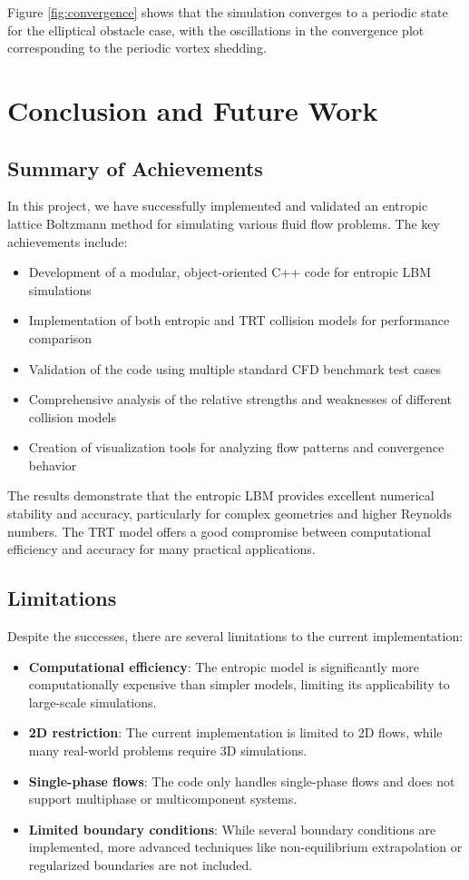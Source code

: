 \documentclass[12pt,a4paper]{article}
\begin{document}
Figure \ref{fig:convergence} shows that the simulation converges to a periodic state for the elliptical obstacle case, with the oscillations in the convergence plot corresponding to the periodic vortex shedding.

\section{Conclusion and Future Work}

\subsection{Summary of Achievements}
In this project, we have successfully implemented and validated an entropic lattice Boltzmann method for simulating various fluid flow problems. The key achievements include:

\begin{itemize}
    \item Development of a modular, object-oriented C++ code for entropic LBM simulations
    \item Implementation of both entropic and TRT collision models for performance comparison
    \item Validation of the code using multiple standard CFD benchmark test cases
    \item Comprehensive analysis of the relative strengths and weaknesses of different collision models
    \item Creation of visualization tools for analyzing flow patterns and convergence behavior
\end{itemize}

The results demonstrate that the entropic LBM provides excellent numerical stability and accuracy, particularly for complex geometries and higher Reynolds numbers. The TRT model offers a good compromise between computational efficiency and accuracy for many practical applications.

\subsection{Limitations}
Despite the successes, there are several limitations to the current implementation:

\begin{itemize}
    \item \textbf{Computational efficiency}: The entropic model is significantly more computationally expensive than simpler models, limiting its applicability to large-scale simulations.
    \item \textbf{2D restriction}: The current implementation is limited to 2D flows, while many real-world problems require 3D simulations.
    \item \textbf{Single-phase flows}: The code only handles single-phase flows and does not support multiphase or multicomponent systems.
    \item \textbf{Limited boundary conditions}: While several boundary conditions are implemented, more advanced techniques like non-equilibrium extrapolation or regularized boundaries are not included.
\end{itemize}
\end{document}
